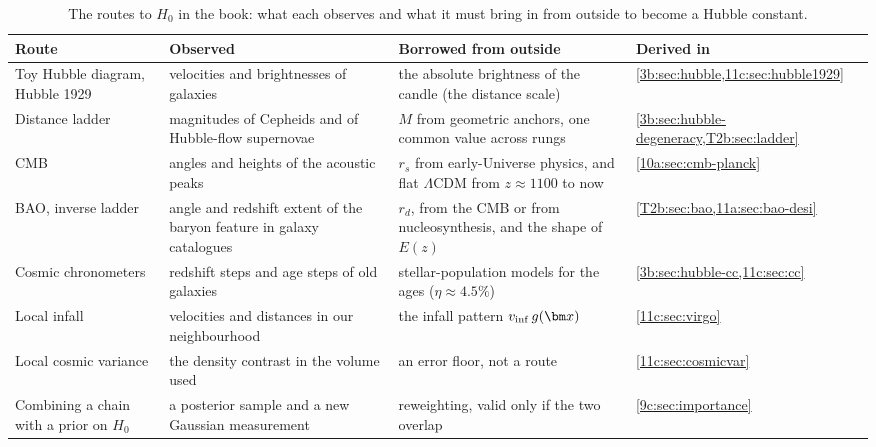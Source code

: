 \begin{table}[htbp]
\centering
\small
\renewcommand{\arraystretch}{1.25}
\begin{tabular}{@{}p{3.1cm}p{3.7cm}p{4.4cm}p{3.5cm}@{}}
\toprule
Route & Observed & Borrowed from outside & Derived in\\
\midrule
Toy Hubble diagram, Hubble 1929 &
  velocities and brightnesses of galaxies &
  the absolute brightness of the candle (the distance scale) &
  \cref{3b:sec:hubble,11c:sec:hubble1929}\\
Distance ladder &
  magnitudes of Cepheids and of Hubble-flow supernovae &
  $M$ from geometric anchors, one common value across rungs &
  \cref{3b:sec:hubble-degeneracy,T2b:sec:ladder}\\
CMB &
  angles and heights of the acoustic peaks &
  $r_s$ from early-Universe physics, and flat $\Lambda$CDM from $z\approx1100$ to now &
  \cref{10a:sec:cmb-planck}\\
BAO, inverse ladder &
  angle and redshift extent of the baryon feature in galaxy catalogues &
  $r_d$, from the CMB or from nucleosynthesis, and the shape of $E(z)$ &
  \cref{T2b:sec:bao,11a:sec:bao-desi}\\
Cosmic chronometers &
  redshift steps and age steps of old galaxies &
  stellar-population models for the ages ($\eta\approx4.5\%$) &
  \cref{3b:sec:hubble-cc,11c:sec:cc}\\
Local infall &
  velocities and distances in our neighbourhood &
  the infall pattern $v_{\rm inf}\,g(\bm x)$ &
  \cref{11c:sec:virgo}\\
Local cosmic variance &
  the density contrast in the volume used &
  an error floor, not a route &
  \cref{11c:sec:cosmicvar}\\
Combining a chain with a prior on $H_0$ &
  a posterior sample and a new Gaussian measurement &
  reweighting, valid only if the two overlap &
  \cref{9c:sec:importance}\\
\bottomrule
\end{tabular}
\caption{The routes to $H_0$ in the book: what each observes and what it must bring in from
outside to become a Hubble constant.}
\label{11c:tab:h0-borrow}
\end{table}

